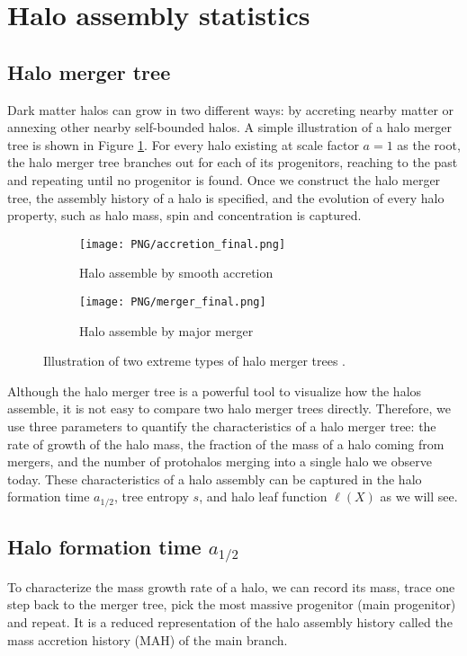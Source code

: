\section{Halo assembly statistics}
\label{sec:halo}

\subsection{Halo merger tree}
Dark matter halos can grow in two different ways: by accreting nearby matter or annexing other nearby self-bounded halos. A simple illustration of a halo merger tree is shown in Figure \ref{fig:MT}. For every halo existing at scale factor $a=1$ as the root, the halo merger tree branches out for each of its progenitors, reaching to the past and repeating until no progenitor is found. Once we construct the halo merger tree, the assembly history of a halo is specified, and the evolution of every halo property, such as halo mass, spin and concentration is captured.


\begin{figure}[!h]
\begin{center}
\begin{subfigure}[h]{0.48\columnwidth}
        \texttt{[image: PNG/accretion\_final.png]}
        \caption{Halo assemble by smooth accretion}
\end{subfigure}
\begin{subfigure}[h]{0.48\columnwidth}
        \texttt{[image: PNG/merger\_final.png]}
        \caption{Halo assemble by major merger}
\end{subfigure}
	    \caption{\label{fig:MT} Illustration of two extreme types of halo merger trees \cite{tree entropy}.} 
\end{center}
\end{figure}



Although the halo merger tree is a powerful tool to visualize how the halos assemble, it is not easy to compare two halo merger trees directly. Therefore, we use three parameters to quantify the characteristics of a halo merger tree:
the rate of growth of the halo mass, the fraction of the mass of a halo coming from mergers, and the number of protohalos merging into a single halo we observe today.
These characteristics of a halo assembly can be captured in the halo formation time $a_{1/2}$, tree entropy $s$, and halo leaf function $\ell(X)$ as we will see.


\subsection{Halo formation time $a_{1/2}$}
To characterize the mass growth rate of a halo, we can record its mass, trace one step back to the merger tree, pick the most massive progenitor (main progenitor) and repeat. It is a reduced representation of the halo assembly history called the mass accretion history (MAH) of the main branch.

